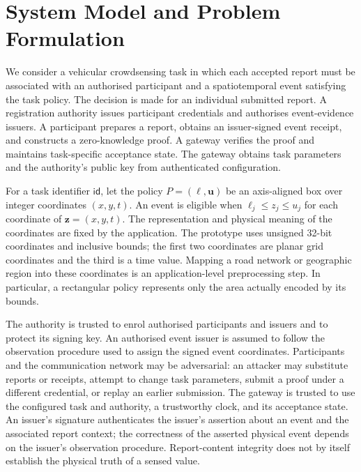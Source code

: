 \section{System Model and Problem Formulation}
\label{sec:model}

We consider a vehicular crowdsensing task in which each accepted report must be associated with an authorised participant and a spatiotemporal event satisfying the task policy. The decision is made for an individual submitted report. A registration authority issues participant credentials and authorises event-evidence issuers. A participant prepares a report, obtains an issuer-signed event receipt, and constructs a zero-knowledge proof. A gateway verifies the proof and maintains task-specific acceptance state. The gateway obtains task parameters and the authority's public key from authenticated configuration.

For a task identifier $\mathsf{id}$, let the policy $P=(\boldsymbol{\ell},\boldsymbol{u})$ be an axis-aligned box over integer coordinates $(x,y,t)$. An event is eligible when $\ell_j\leq z_j\leq u_j$ for each coordinate of $\boldsymbol z=(x,y,t)$. The representation and physical meaning of the coordinates are fixed by the application. The prototype uses unsigned 32-bit coordinates and inclusive bounds; the first two coordinates are planar grid coordinates and the third is a time value. Mapping a road network or geographic region into these coordinates is an application-level preprocessing step. In particular, a rectangular policy represents only the area actually encoded by its bounds.

The authority is trusted to enrol authorised participants and issuers and to protect its signing key. An authorised event issuer is assumed to follow the observation procedure used to assign the signed event coordinates. Participants and the communication network may be adversarial: an attacker may substitute reports or receipts, attempt to change task parameters, submit a proof under a different credential, or replay an earlier submission. The gateway is trusted to use the configured task and authority, a trustworthy clock, and its acceptance state. An issuer's signature authenticates the issuer's assertion about an event and the associated report context; the correctness of the asserted physical event depends on the issuer's observation procedure. Report-content integrity does not by itself establish the physical truth of a sensed value.

